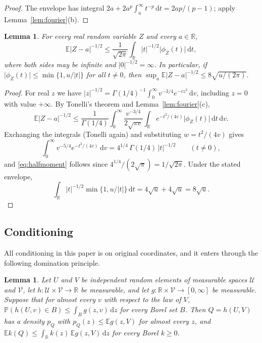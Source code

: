 \documentclass[11pt]{amsart}
\numberwithin{equation}{section}
\newtheorem{lemma}[theorem]{Lemma}
\theoremstyle{definition}
\theoremstyle{remark}
\newcommand{\R}{\mathbb R}
\newcommand{\E}{\mathbb E}
\newcommand{\PP}{\mathbb P}
\newcommand{\1}{\mathbf 1}
\newcommand{\dd}{\,\mathrm d}
\newcommand{\abs}[1]{\lvert #1\rvert}
\begin{document}
\begin{proof}
The envelope has integral $2a+2a^p\int_a^\infty t^{-p}\dd t=2ap/(p-1)$; apply Lemma~\ref{lem:fourier}(b).
\end{proof}

\begin{lemma}\label{lem:halfmoment}
For every real random variable $Z$ and every $a\in\R$,
\begin{equation}\label{eq:halfmoment}
\E\abs{Z-a}^{-1/2}\le\frac1{\sqrt{2\pi}}\int_\R\abs t^{-1/2}\abs{\phi_Z(t)}\dd t,
\end{equation}
where both sides may be infinite and $\abs0^{-1/2}=\infty$. In particular, if $\abs{\phi_Z(t)}\le\min\{1,u/\abs t\}$ for all $t\ne0$, then $\sup_a\E\abs{Z-a}^{-1/2}\le8\sqrt{u/(2\pi)}$.
\end{lemma}

\begin{proof}
For real $z$ we have $\abs z^{-1/2}=\Gamma(1/4)^{-1}\int_0^\infty v^{-3/4}e^{-vz^2}\dd v$, including $z=0$ with value $+\infty$. By Tonelli's theorem and Lemma~\ref{lem:fourier}(c),
\[
\E\abs{Z-a}^{-1/2}\le\frac{1}{\Gamma(1/4)}\int_0^\infty\frac{v^{-3/4}}{2\sqrt{\pi v}}\int_\R e^{-t^2/(4v)}\abs{\phi_Z(t)}\dd t\dd v .
\]
Exchanging the integrals (Tonelli again) and substituting $w=t^2/(4v)$ gives
\[
\int_0^\infty v^{-5/4}e^{-t^2/(4v)}\dd v=4^{1/4}\,\Gamma(1/4)\,\abs t^{-1/2}\qquad(t\ne0),
\]
and \eqref{eq:halfmoment} follows since $4^{1/4}/(2\sqrt\pi)=1/\sqrt{2\pi}$. Under the stated envelope,
\[
\int_\R\abs t^{-1/2}\min\{1,u/\abs t\}\dd t=4\sqrt u+4\sqrt u=8\sqrt u .
\]
\end{proof}

\subsection{Conditioning}
All conditioning in this paper is on original coordinates, and it enters through the following domination principle.

\begin{lemma}\label{lem:condition}
Let $U$ and $V$ be independent random elements of measurable spaces $\mathcal U$ and $\mathcal V$, let $h:\mathcal U\times\mathcal V\to\R$ be measurable, and let $g:\R\times\mathcal V\to[0,\infty]$ be measurable. Suppose that for almost every $v$ with respect to the law of $V$, $\PP(h(U,v)\in B)\le\int_Bg(z,v)\dd z$ for every Borel set $B$. Then $Q=h(U,V)$ has a density $p_Q$ with $p_Q(z)\le\E g(z,V)$ for almost every $z$, and $\E k(Q)\le\int_\R k(z)\,\E g(z,V)\dd z$ for every Borel $k\ge0$.
\end{lemma}
\end{document}
